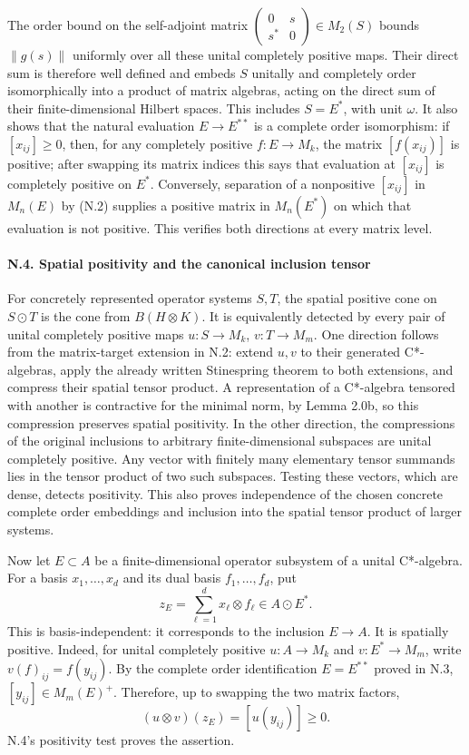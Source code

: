 \documentclass[
  11pt,
]{article}
\begin{document}
The order bound on the self-adjoint matrix
\(\begin{pmatrix}0&s\\s^*&0\end{pmatrix}\in M_2(S)\) bounds \(\|g(s)\|\)
uniformly over all these unital completely positive maps. Their direct
sum is therefore well defined and embeds \(S\) unitally and completely
order isomorphically into a product of matrix algebras, acting on the
direct sum of their finite-dimensional Hilbert spaces. This includes
\(S=E^*\), with unit \(\omega\). It also shows that the natural
evaluation \(E\to E^{**}\) is a complete order isomorphism: if
\([x_{ij}]\geq0\), then, for any completely positive \(f:E\to M_k\), the
matrix \([f(x_{ij})]\) is positive; after swapping its matrix indices
this says that evaluation at \([x_{ij}]\) is completely positive on
\(E^*\). Conversely, separation of a nonpositive \([x_{ij}]\) in
\(M_n(E)\) by (N.2) supplies a positive matrix in \(M_n(E^*)\) on which
that evaluation is not positive. This verifies both directions at every
matrix level.

\paragraph{N.4. Spatial positivity and the canonical inclusion
tensor}\label{n.4.-spatial-positivity-and-the-canonical-inclusion-tensor}

For concretely represented operator systems \(S,T\), the spatial
positive cone on \(S\odot T\) is the cone from \(B(H\otimes K)\). It is
equivalently detected by every pair of unital completely positive maps
\(u:S\to M_k\), \(v:T\to M_m\). One direction follows from the
matrix-target extension in N.2: extend \(u,v\) to their generated
C*-algebras, apply the already written Stinespring theorem to both
extensions, and compress their spatial tensor product. A representation
of a C*-algebra tensored with another is contractive for the minimal
norm, by Lemma 2.0b, so this compression preserves spatial positivity.
In the other direction, the compressions of the original inclusions to
arbitrary finite-dimensional subspaces are unital completely positive.
Any vector with finitely many elementary tensor summands lies in the
tensor product of two such subspaces. Testing these vectors, which are
dense, detects positivity. This also proves independence of the chosen
concrete complete order embeddings and inclusion into the spatial tensor
product of larger systems.

Now let \(E\subset A\) be a finite-dimensional operator subsystem of a
unital C*-algebra. For a basis \(x_1,\ldots,x_d\) and its dual basis
\(f_1,\ldots,f_d\), put \[
z_E=\sum_{\ell=1}^d x_\ell\otimes f_\ell\in A\odot E^*.
\tag{N.4}
\] This is basis-independent: it corresponds to the inclusion
\(E\to A\). It is spatially positive. Indeed, for unital completely
positive \(u:A\to M_k\) and \(v:E^*\to M_m\), write
\(v(f)_{ij}=f(y_{ij})\). By the complete order identification
\(E=E^{**}\) proved in N.3, \([y_{ij}]\in M_m(E)^+\). Therefore, up to
swapping the two matrix factors, \[
(u\otimes v)(z_E)=[u(y_{ij})]\geq0.
\] N.4's positivity test proves the assertion.
\end{document}
